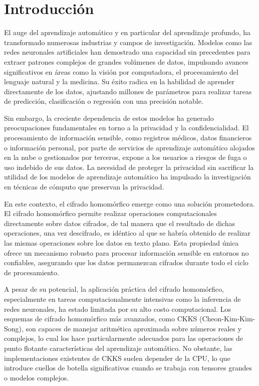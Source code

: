 \chapter*{Introducción}

El auge del aprendizaje automático y en particular del aprendizaje profundo, ha transformado numerosas industrias y campos de investigación. Modelos como las redes neuronales artificiales han demostrado una capacidad sin precedentes para extraer patrones complejos de grandes volúmenes de datos, impulsando avances significativos en áreas como la visión por computadora, el procesamiento del lenguaje natural y la medicina. Su éxito radica en la habilidad de aprender directamente de los datos, ajustando millones de parámetros para realizar tareas de predicción, clasificación o regresión con una precisión notable.

Sin embargo, la creciente dependencia de estos modelos ha generado preocupaciones fundamentales en torno a la privacidad y la confidencialidad. El procesamiento de información sensible, como registros médicos, datos financieros o información personal, por parte de servicios de aprendizaje automático alojados en la nube o gestionados por terceros, expone a los usuarios a riesgos de fuga o uso indebido de sus datos. La necesidad de proteger la privacidad sin sacrificar la utilidad de los modelos de aprendizaje automático ha impulsado la investigación en técnicas de cómputo que preservan la privacidad.

En este contexto, el cifrado homomórfico emerge como una solución prometedora. El cifrado homomórfico permite realizar operaciones computacionales directamente sobre datos cifrados, de tal manera que el resultado de dichas operaciones, una vez descifrado, es idéntico al que se habría obtenido de realizar las mismas operaciones sobre los datos en texto plano. Esta propiedad única ofrece un mecanismo robusto para procesar información sensible en entornos no confiables, asegurando que los datos permanezcan cifrados durante todo el ciclo de procesamiento.

A pesar de su potencial, la aplicación práctica del cifrado homomórfico, especialmente en tareas computacionalmente intensivas como la inferencia de redes neuronales, ha estado limitada por su alto costo computacional. Los esquemas de cifrado homomórfico más avanzados, como CKKS (Cheon-Kim-Kim-Song), son capaces de manejar aritmética aproximada sobre números reales y complejos, lo cual los hace particularmente adecuados para las operaciones de punto flotante características del aprendizaje automático. No obstante, las implementaciones existentes de CKKS suelen depender de la CPU, lo que introduce cuellos de botella significativos cuando se trabaja con tensores grandes o modelos complejos.

